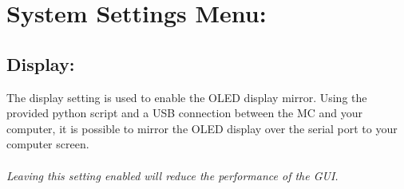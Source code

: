 \chapter{System Settings Menu:}

\section{Display:}
The display setting is used to enable the OLED display mirror. Using the provided python script and a USB connection between the MC and your computer, it is possible to mirror the OLED display over the serial port to your computer screen.\\
\\
\textit{Leaving this setting enabled will reduce the performance of the GUI.}